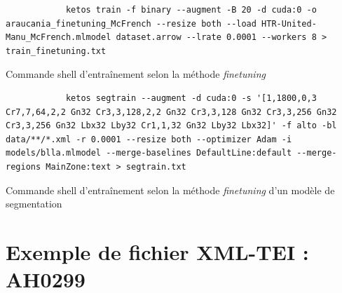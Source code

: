 \begin{listing}[h]
    \centering
	        \begin{verbatim}
	        ketos train -f binary --augment -B 20 -d cuda:0 -o araucania_finetuning_McFrench --resize both --load HTR-United-Manu_McFrench.mlmodel dataset.arrow --lrate 0.0001 --workers 8 > train_finetuning.txt
	        \end{verbatim}
        	\caption{Commande shell d'entraînement selon la méthode \textit{finetuning}}
        	\label{code:finetuning}
\end{listing}

\begin{listing}[h]
            \centering
	        \begin{verbatim}
	        ketos segtrain --augment -d cuda:0 -s '[1,1800,0,3 Cr7,7,64,2,2 Gn32 Cr3,3,128,2,2 Gn32 Cr3,3,128 Gn32 Cr3,3,256 Gn32 Cr3,3,256 Gn32 Lbx32 Lby32 Cr1,1,32 Gn32 Lby32 Lbx32]' -f alto -bl data/**/*.xml -r 0.0001 --resize both --optimizer Adam -i models/blla.mlmodel --merge-baselines DefaultLine:default --merge-regions MainZone:text > segtrain.txt  
	        \end{verbatim}
        	\caption{Commande shell d'entraînement selon la méthode \textit{finetuning} d'un modèle de segmentation}
        	\label{code:segment}
\end{listing}

\chapter{Exemple de fichier XML-TEI : AH0299}

